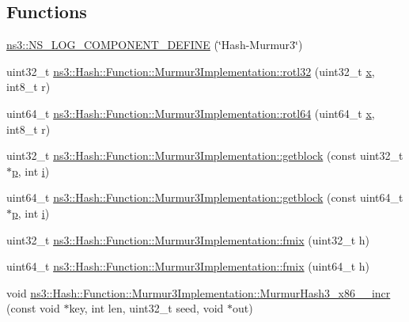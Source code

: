 \subsection*{Functions}
\begin{DoxyCompactItemize}
\item 
\hyperlink{namespacens3_a7db4065a6644f2c348a2fce7d97634a4}{ns3\+::\+N\+S\+\_\+\+L\+O\+G\+\_\+\+C\+O\+M\+P\+O\+N\+E\+N\+T\+\_\+\+D\+E\+F\+I\+NE} (\char`\"{}Hash-\/Murmur3\char`\"{})
\item 
uint32\+\_\+t \hyperlink{group__hash__murmur3_ga5ad09e63b7268f407b727713d0f6687a}{ns3\+::\+Hash\+::\+Function\+::\+Murmur3\+Implementation\+::rotl32} (uint32\+\_\+t \hyperlink{lte__link__budget__x2__handover__measures_8m_a9336ebf25087d91c818ee6e9ec29f8c1}{x}, int8\+\_\+t r)
\item 
uint64\+\_\+t \hyperlink{group__hash__murmur3_ga5649fec849183845d5f53fd54c9bd509}{ns3\+::\+Hash\+::\+Function\+::\+Murmur3\+Implementation\+::rotl64} (uint64\+\_\+t \hyperlink{lte__link__budget__x2__handover__measures_8m_a9336ebf25087d91c818ee6e9ec29f8c1}{x}, int8\+\_\+t r)
\item 
uint32\+\_\+t \hyperlink{group__hash__murmur3_ga82df4ed13fd9546755cdf465105a524c}{ns3\+::\+Hash\+::\+Function\+::\+Murmur3\+Implementation\+::getblock} (const uint32\+\_\+t $\ast$\hyperlink{lte__link__budget__x2__handover__measures_8m_ac9de518908a968428863f829398a4e62}{p}, int \hyperlink{lte__uplink__power__control_8m_a6f6ccfcf58b31cb6412107d9d5281426}{i})
\item 
uint64\+\_\+t \hyperlink{group__hash__murmur3_ga45409abb5582f7786cd88c3c8e19744c}{ns3\+::\+Hash\+::\+Function\+::\+Murmur3\+Implementation\+::getblock} (const uint64\+\_\+t $\ast$\hyperlink{lte__link__budget__x2__handover__measures_8m_ac9de518908a968428863f829398a4e62}{p}, int \hyperlink{lte__uplink__power__control_8m_a6f6ccfcf58b31cb6412107d9d5281426}{i})
\item 
uint32\+\_\+t \hyperlink{group__hash__murmur3_ga5ace0a4c6b8f2b26528d6b939a6768ac}{ns3\+::\+Hash\+::\+Function\+::\+Murmur3\+Implementation\+::fmix} (uint32\+\_\+t h)
\item 
uint64\+\_\+t \hyperlink{group__hash__murmur3_gac511a112658af466a7fd65fcb88c35b9}{ns3\+::\+Hash\+::\+Function\+::\+Murmur3\+Implementation\+::fmix} (uint64\+\_\+t h)
\item 
void \hyperlink{group__hash__murmur3_gad303b7fe16fa5487f07a732c50128542}{ns3\+::\+Hash\+::\+Function\+::\+Murmur3\+Implementation\+::\+Murmur\+Hash3\+\_\+x86\+\_\+\_\+incr} (const void $\ast$key, int len, uint32\+\_\+t seed, void $\ast$out)

\end{DoxyCompactItemize}
